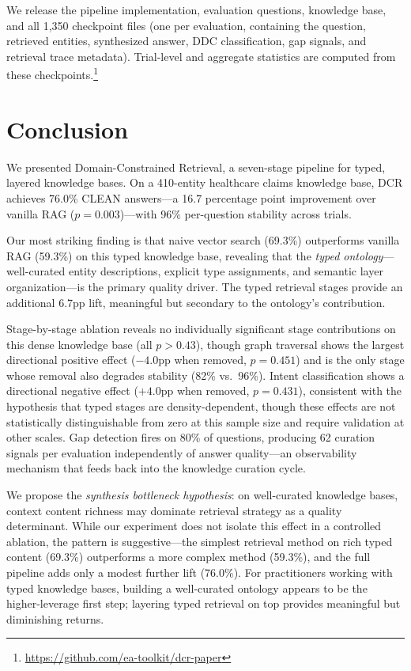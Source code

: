 \documentclass[11pt,a4paper]{article}
\begin{document}
We release the pipeline implementation, evaluation questions, knowledge base, and all 1,350 checkpoint files (one per evaluation, containing the question, retrieved entities, synthesized answer, DDC classification, gap signals, and retrieval trace metadata). Trial-level and aggregate statistics are computed from these checkpoints.\footnote{\url{https://github.com/ea-toolkit/dcr-paper}}

\section{Conclusion}
\label{sec:conclusion}

We presented Domain-Constrained Retrieval, a seven-stage pipeline for typed, layered knowledge bases. On a 410-entity healthcare claims knowledge base, DCR achieves 76.0\% CLEAN answers---a 16.7 percentage point improvement over vanilla RAG ($p = 0.003$)---with 96\% per-question stability across trials.

Our most striking finding is that naive vector search (69.3\%) outperforms vanilla RAG (59.3\%) on this typed knowledge base, revealing that the \emph{typed ontology}---well-curated entity descriptions, explicit type assignments, and semantic layer organization---is the primary quality driver. The typed retrieval stages provide an additional 6.7pp lift, meaningful but secondary to the ontology's contribution.

Stage-by-stage ablation reveals no individually significant stage contributions on this dense knowledge base (all $p > 0.43$), though graph traversal shows the largest directional positive effect ($-4.0$pp when removed, $p = 0.451$) and is the only stage whose removal also degrades stability (82\% vs.\ 96\%). Intent classification shows a directional negative effect ($+4.0$pp when removed, $p = 0.431$), consistent with the hypothesis that typed stages are density-dependent, though these effects are not statistically distinguishable from zero at this sample size and require validation at other scales. Gap detection fires on 80\% of questions, producing 62 curation signals per evaluation independently of answer quality---an observability mechanism that feeds back into the knowledge curation cycle.

We propose the \emph{synthesis bottleneck hypothesis}: on well-curated knowledge bases, context content richness may dominate retrieval strategy as a quality determinant. While our experiment does not isolate this effect in a controlled ablation, the pattern is suggestive---the simplest retrieval method on rich typed content (69.3\%) outperforms a more complex method (59.3\%), and the full pipeline adds only a modest further lift (76.0\%). For practitioners working with typed knowledge bases, building a well-curated ontology appears to be the higher-leverage first step; layering typed retrieval on top provides meaningful but diminishing returns.
\end{document}
